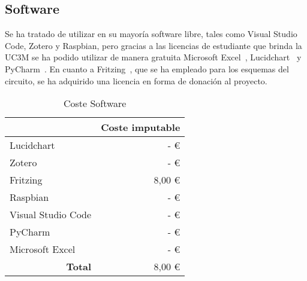 \subsection{Software}\label{subsec:software}
Se ha tratado de utilizar en su mayoría software libre, tales como Visual Studio Code, Zotero y Raspbian, pero gracias a las licencias de estudiante que brinda la UC3M se ha podido utilizar de manera gratuita Microsoft Excel~\cite{microsoft_microsoft_nodate}, Lucidchart~\cite{noauthor_usecase_nodate} y PyCharm~\cite{noauthor_free_nodate}. En cuanto a Fritzing~\cite{noauthor_fritzing_nodate}, que se ha empleado para los esquemas del circuito, se ha adquirido una licencia en forma de donación al proyecto.

\begin{table}[H]
	\centering
	\caption{Coste Software}
	\label{tab:coste_software}
	\begin{tabular}{l|r|}
		\hline
		\rowcolor[HTML]{BFBFBF}
		\multicolumn{1}{|c|}{\cellcolor[HTML]{BFBFBF}\textbf{Descripción}} & \multicolumn{1}{c|}{\cellcolor[HTML]{BFBFBF}\textbf{Coste imputable}} \\ \hline
		\multicolumn{1}{|l|}{Lucidchart}                                   & -   €                                                                 \\ \hline
		\multicolumn{1}{|l|}{Zotero}                                       & -   €                                                                 \\ \hline
		\multicolumn{1}{|l|}{Fritzing}                                     & 8,00 €                                                                \\ \hline
		\multicolumn{1}{|l|}{Raspbian}                                     & -   €                                                                 \\ \hline
		\multicolumn{1}{|l|}{Visual Studio Code}                           & -   €                                                                 \\ \hline
		\multicolumn{1}{|l|}{PyCharm}                                      & -   €                                                                 \\ \hline
		\multicolumn{1}{|l|}{Microsoft Excel}                              & -   €                                                                 \\ \hline
		\multicolumn{1}{r|}{\textbf{Total}}                                & 8,00 €                                                                \\ \cline{2-2}
	\end{tabular}
\end{table}

